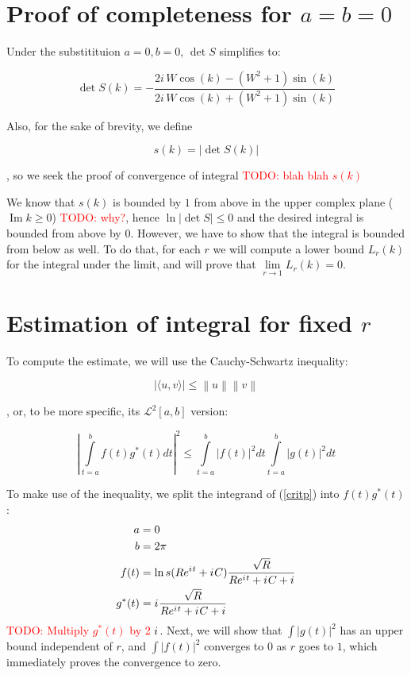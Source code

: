 \documentclass[12pt, a4paper]{article}
\newcommand{\abs}[1]{\left| #1 \right|}
\newcommand{\mcL}{\mathcal{L}}
\newcommand{\eexp}[1]{e^{#1}}
\newcommand{\iu}{{i\mkern1mu}}
\renewcommand{\Im}{\operatorname{Im}}
\newcommand{\todo}[1]{{\large \textcolor{red}{TODO: #1}}}
\begin{document}
\section{Proof of completeness for $a = b = 0$}
Under the substitituion $a = 0, b = 0$, $\det S$ simplifies to:

\[
\det S(k) = - \frac{2 i \, W \cos\left(k\right) - {\left(W^{2} + 1\right)} \sin\left(k\right)}{2 i \, W \cos\left(k\right) + {\left(W^{2} + 1\right)} \sin\left(k\right)}
\]

Also, for the sake of brevity, we define 

\[
s(k) = \abs{\det S(k)}
\]

, so we seek the proof of convergence of integral \todo{blah blah $s(k)$}

We know that $s(k)$ is bounded by $1$ from above in the upper complex plane  ($\Im k \ge 0$) \todo{why?}, hence $\ln \abs{\det S} \le 0$ and the desired integral is bounded from above by $0$. However, we have to show that the integral is bounded from below as well. To do that, for each $r$ we will compute a lower bound $L_r(k)$ for the integral under the limit, and will prove that $\lim\limits_{r \to 1} L_r(k) = 0$.

\section{Estimation of integral for fixed $r$}


To compute the estimate, we will use the Cauchy-Schwartz inequality:

\[
\big| \langle u,v \rangle \big| \leq \left\|u\right\| \left\|v\right\|
\]

, or, to be more specific, its $\mcL^2[a, b]$ version:

\[
\abs{
\int\limits_{t=a}^{b} f(t) g^*(t) dt
}^2
\le
\int\limits_{t=a}^b \abs{f(t)}^2 dt 
\int\limits_{t=a}^b \abs{g(t)}^2 dt 
\]

To make use of the inequality, we split the integrand of (\ref{critp}) into $f(t) g^*(t)$:
\begin{align*}
a      &= 0 \\
b      &= 2 \pi \\
f(t)   &= \ln s(R \eexp{\iu t} + \iu C) \frac{\sqrt{R}}{R \eexp{\iu t} + \iu C + i} \\
g^*(t) &= \iu \frac{\sqrt{R}}{R \eexp{\iu t} + \iu C + i}
\end{align*}
\todo{Multiply $g^*(t)$ by 2 $\iu$}. Next, we will show that $\int \abs{g(t)}^2$ has an upper bound independent of $r$, and $\int \abs{f(t)}^2$ converges to $0$ as $r$ goes to $1$, which immediately proves the convergence to zero.
\end{document}
